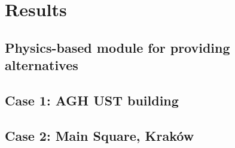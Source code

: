 \chapter{Results}
\label{cha:results}

\section{Physics-based module for providing alternatives}
\label{sec:physics-module}

\section{Case 1: AGH UST building}

\section{Case 2: Main Square, Kraków}